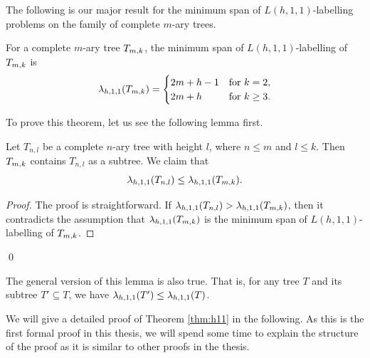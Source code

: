 
The following is our major result for the minimum span of $L(h,1,1)$-labelling problems on the family of complete $m$-ary trees. 

\begin{theorem}
\label{thm:h11} 
For a complete $m$-ary tree $T_{m,k}$, the minimum span of $L(h,1,1)$-labelling of $T_{m,k}$ is
\begin{align}
\label{h11}
 \lambda_{h,1,1}(T_{m,k}) =
  \begin{cases}
   2m+h-1 & \text{for } k = 2, \\
   2m+h       & \text{for } k \ge 3.
  \end{cases}
\end{align}
\end{theorem}

To prove this theorem, let us see the following lemma first. 
\begin{lemma}
\label{subtree} 
Let $T_{n,l}$ be a complete $n$-ary tree with height $l$, where $n \le m$ and $l \le k$. Then $T_{m,k}$ contains $T_{n,l}$ as a subtree. We claim that 
\[
\lambda_{h,1,1}(T_{n,l}) \le \lambda_{h,1,1}(T_{m,k}).
\] 
\end{lemma}

\begin{proof}
The proof is straightforward. If $\lamh11(T_{n,l}) > \lamh11(\tmk)$, then it contradicts the assumption that $\lamh11(\tmk)$ is the minimum span of $L(h,1,1)$-labelling of $T_{m,k}$. 
\end{proof}
\qed

The general version of this lemma is also true. That is, for any tree $T$ and its subtree $T' \subseteq T$, we have $\lamh11(T') \le \lamh11(T)$. 

 We will give a detailed proof of Theorem \ref{thm:h11} in the following. As this is the first formal proof in  this thesis, we will spend some time to explain the structure of the proof as it is similar to other proofs in the thesis. 

